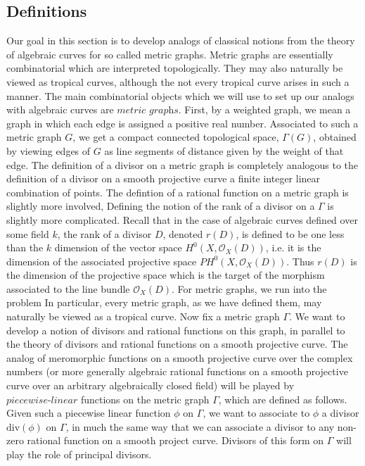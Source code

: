 \documentclass{article}
\begin{document}
\subsection{Definitions}
Our goal in this section is to develop analogs of classical notions from the theory of algebraic curves for so called metric graphs. Metric graphs are essentially combinatorial which are interpreted topologically. They may also naturally be viewed as tropical curves, although the not every tropical curve arises in such a manner. 
\newline
\newline
The main combinatorial objects which we will use to set up our analogs with algebraic curves are $\textit{metric graphs}$. First, by a weighted graph, we mean a graph in which each edge is assigned a positive real number. Associated to such a metric graph $G$, we get a compact connected topological space, $\Gamma (G)$, obtained by viewing edges of $G$ as line segments of distance given by the weight of that edge. The definition of a divisor on a metric graph is completely analogous to the definition of a divisor on a smooth projective curve a finite integer linear combination of points. The defintion of a rational function on a metric graph is slightly more involved, 
\newline
\newline
Defining the notion of the rank of a divisor on a $\Gamma$ is slightly more complicated. Recall that in the case of algebraic curves defined over some field $k$, the rank of a divisor $D$, denoted $r(D)$, is defined to be one less than the $k$ dimension of the vector space $H^{0}(X, \mathcal{O}_X(D))$, i.e. it is the dimension of the associated projective space $PH^{0}(X, \mathcal{O}_X(D))$. Thus $r(D)$ is the dimension of the projective space which is the target of the morphism associated to the line bundle $\mathcal{O}_X(D)$. For metric graphs, we run into the problem 
\newline
\newline
In particular, every metric graph, as we have defined them, may naturally be viewed as a tropical curve. 
\newline
\newline
Now fix a metric graph $\Gamma$. We want to develop a notion of divisors and rational functions on this graph, in parallel to the theory of divisors and rational functions on a smooth projective curve. The analog of meromorphic functions on a smooth projective curve over the complex numbers (or more generally algebraic rational functions on a smooth projective curve over an arbitrary algebraically closed field) will be played by $\textit{piecewise-linear}$ functions on the metric graph $\Gamma$, which are defined as follows. Given such a piecewise linear function $\phi$ on $\Gamma$, we want to associate to $\phi$ a divisor $\text{div}(\phi)$ on $\Gamma$, in much the same way that we can associate a divisor to any non-zero rational function on a smooth project curve. Divisors of this form on $\Gamma$ will play the role of principal divisors. 
\end{document}
